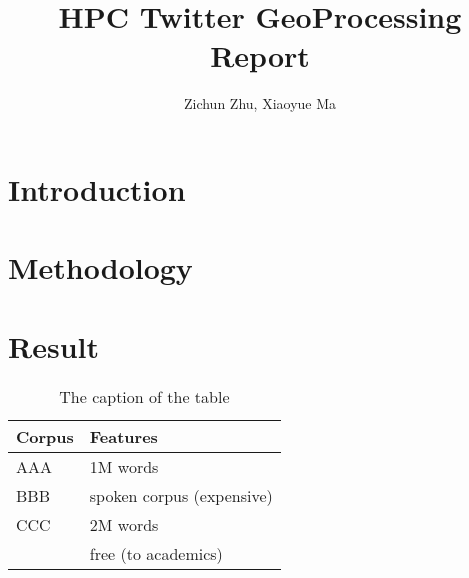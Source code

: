 \documentclass[11pt]{article}
\title{HPC Twitter GeoProcessing Report}
\author
{Zichun Zhu, Xiaoyue Ma}
\begin{document}
\maketitle


\section{Introduction}

\section{Methodology}

\section{Result}


\begin{table}[h]
 \begin{center}
\begin{tabular}{|l|l|}

      \hline
      Corpus & Features\\
      \hline\hline
      AAA & 1M words\\
      BBB & spoken corpus (expensive)\\
      CCC & 2M words\\
        & free (to academics)\\
      \hline

\end{tabular}
\caption{The caption of the table}\label{table1}
 \end{center}
\end{table}
\end{document}
